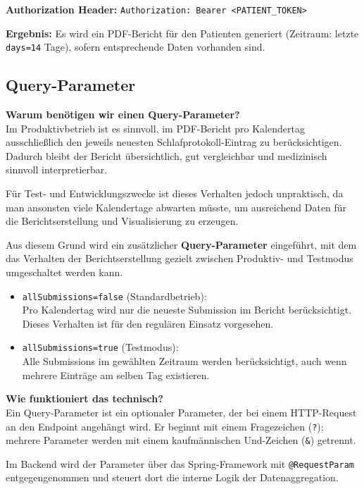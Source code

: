 \textbf{Authorization Header:} \texttt{Authorization: Bearer <PATIENT\_TOKEN>}

\textbf{Ergebnis:} Es wird ein PDF-Bericht für den Patienten generiert (Zeitraum: letzte \texttt{days=14} Tage), sofern entsprechende Daten vorhanden sind.

\newpage

\subsection{Query-Parameter}

\textbf{Warum benötigen wir einen Query-Parameter?}\\
Im Produktivbetrieb ist es sinnvoll, im PDF-Bericht pro Kalendertag ausschließlich
den jeweils neuesten Schlafprotokoll-Eintrag zu berücksichtigen. Dadurch bleibt
der Bericht übersichtlich, gut vergleichbar und medizinisch sinnvoll interpretierbar.

Für Test- und Entwicklungszwecke ist dieses Verhalten jedoch unpraktisch, da man
ansonsten viele Kalendertage abwarten müsste, um ausreichend Daten für die
Berichtserstellung und Visualisierung zu erzeugen.

Aus diesem Grund wird ein zusätzlicher \textbf{Query-Parameter} eingeführt, mit dem
das Verhalten der Berichtserstellung gezielt zwischen Produktiv- und Testmodus
umgeschaltet werden kann.

\begin{itemize}
  \item \texttt{allSubmissions=false} (Standardbetrieb):\\
        Pro Kalendertag wird nur die neueste Submission im Bericht berücksichtigt.
        Dieses Verhalten ist für den regulären Einsatz vorgesehen.
  \item \texttt{allSubmissions=true} (Testmodus):\\
        Alle Submissions im gewählten Zeitraum werden berücksichtigt, auch wenn
        mehrere Einträge am selben Tag existieren.
\end{itemize}

\textbf{Wie funktioniert das technisch?}\\
Ein Query-Parameter ist ein optionaler Parameter, der bei einem HTTP-Request an den
Endpoint angehängt wird. Er beginnt mit einem Fragezeichen (\texttt{?}); mehrere
Parameter werden mit einem kaufmännischen Und-Zeichen (\texttt{\&}) getrennt.

Im Backend wird der Parameter über das Spring-Framework mit
\texttt{@RequestParam} entgegengenommen und steuert dort die interne Logik der
Datenaggregation.

